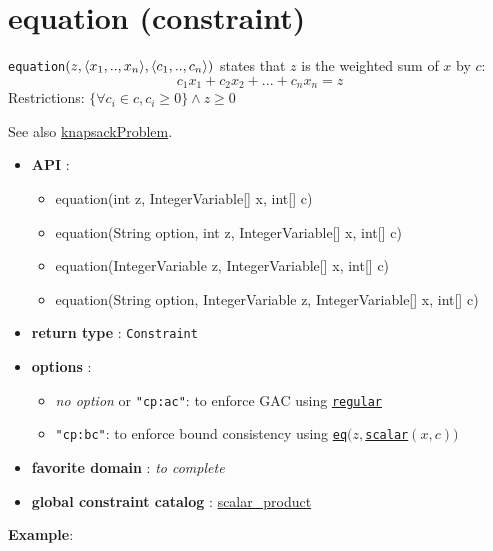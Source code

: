 \label{equation}
\hypertarget{equation}{}

\section{equation (constraint)}\label{equation:equationconstraint}\hypertarget{equation:equationconstraint}{}
\begin{notedef}
  \texttt{equation}$(z, \langle x_1,..,x_n\rangle,\langle c_1,..,c_n\rangle)$ states that $z$ is the weighted sum of $x$ by $c$:
$$c_1x_1+c_2x_2+...+c_nx_n = z$$
Restrictions: $\{\forall c_i \in c, c_i \ge 0\} \wedge z \ge 0$
\end{notedef}
See also \hyperlink{knapsackproblem:knapsackproblemconstraint}{knapsackProblem}.

\begin{itemize}
	\item \textbf{API} :
	\begin{itemize}
		\item equation(int z, IntegerVariable[] x, int[] c)
		\item equation(String option, int z, IntegerVariable[] x, int[] c)
		\item equation(IntegerVariable z, IntegerVariable[] x, int[] c)
		\item equation(String option, IntegerVariable z, IntegerVariable[] x, int[] c)
	\end{itemize}
	\item \textbf{return type} : \texttt{Constraint}
	\item \textbf{options} :
	\begin{itemize}
		\item \emph{no option} or \texttt{"cp:ac"}: to enforce GAC  using \hyperlink{regular}{\texttt{regular}}
		\item \texttt{"cp:bc"}: to enforce bound consistency using \hyperlink{eq}{\texttt{eq}}$(z,$\hyperlink{scalar}{\texttt{scalar}}$(x,c))$
	\end{itemize}
	\item \textbf{favorite domain} : \emph{to complete}
	\item \textbf{global constraint catalog} : \href{http://www.emn.fr/z-info/sdemasse/gccat/Cscalar_product.html}{scalar\_product}
\end{itemize}

\textbf{Example}:

